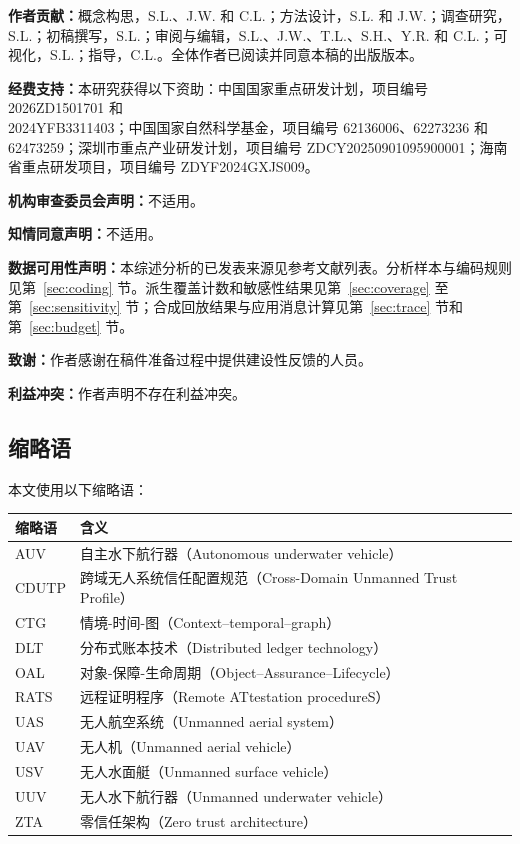 \medskip
\noindent\textbf{作者贡献：}概念构思，S.L.、J.W. 和 C.L.；方法设计，S.L. 和 J.W.；调查研究，S.L.；初稿撰写，S.L.；审阅与编辑，S.L.、J.W.、T.L.、S.H.、Y.R. 和 C.L.；可视化，S.L.；指导，C.L.。全体作者已阅读并同意本稿的出版版本。

\noindent\textbf{经费支持：}本研究获得以下资助：中国国家重点研发计划，项目编号 2026ZD1501701 和\\
2024YFB3311403；中国国家自然科学基金，项目编号 62136006、62273236 和 62473259；深圳市重点产业研发计划，项目编号 ZDCY20250901095900001；海南省重点研发项目，项目编号 ZDYF2024GXJS009。

\noindent\textbf{机构审查委员会声明：}不适用。

\noindent\textbf{知情同意声明：}不适用。

\noindent\textbf{数据可用性声明：}本综述分析的已发表来源见参考文献列表。分析样本与编码规则见第~\ref{sec:coding} 节。派生覆盖计数和敏感性结果见第~\ref{sec:coverage} 至第~\ref{sec:sensitivity} 节；合成回放结果与应用消息计算见第~\ref{sec:trace} 节和第~\ref{sec:budget} 节。

\noindent\textbf{致谢：}作者感谢在稿件准备过程中提供建设性反馈的人员。

\noindent\textbf{利益冲突：}作者声明不存在利益冲突。

\Needspace{90mm}
\subsection*{缩略语}
本文使用以下缩略语：
\begin{longtable}{@{}P{24mm}P{132mm}@{}}\toprule
\textbf{缩略语} & \textbf{含义}\\\midrule
AUV & 自主水下航行器（Autonomous underwater vehicle）\\
CDUTP & 跨域无人系统信任配置规范（Cross-Domain Unmanned Trust Profile）\\
CTG & 情境-时间-图（Context--temporal--graph）\\
DLT & 分布式账本技术（Distributed ledger technology）\\
OAL & 对象-保障-生命周期（Object--Assurance--Lifecycle）\\
RATS & 远程证明程序（Remote ATtestation procedureS）\\
UAS & 无人航空系统（Unmanned aerial system）\\
UAV & 无人机（Unmanned aerial vehicle）\\
USV & 无人水面艇（Unmanned surface vehicle）\\
UUV & 无人水下航行器（Unmanned underwater vehicle）\\
ZTA & 零信任架构（Zero trust architecture）\\\bottomrule
\end{longtable}
